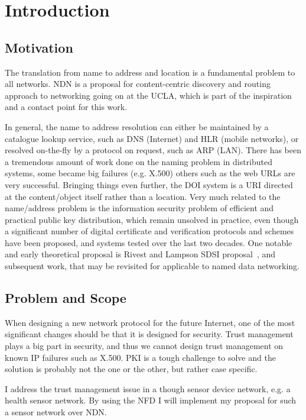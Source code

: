 \chapter{Introduction}\label{chp:introduction} 

\section{Motivation}
The translation from name to address and location is a fundamental problem to all networks.
\gls{NDN} is a proposal for content-centric discovery and routing approach to networking
going on at the \gls{UCLA}, which is part of the inspiration and a contact point for this work.

In general, the name to address resolution can either be maintained by a catalogue lookup service, 
such as \gls{DNS} (Internet) and \gls{HLR} (mobile networks), 
or resolved on-the-fly by a protocol on request, such as \gls{ARP} (\gls{LAN}). 
There has been a tremendous amount of work done on the naming problem in distributed systems, 
some became big failures (e.g. X.500) others such as the web \gls{URL}s are very successful. 
Bringing things even further, the \gls{DOI} system is a \gls{URI} directed at the content/object itself rather than a location. 
Very much related to the name/address problem is the information security problem of efficient and practical public key distribution, 
which remain unsolved in practice, even though a significant number of digital certificate and verification protocols and schemes have been proposed, and systems tested over the last two decades. 
One notable and early theoretical proposal is Rivest and Lampson \gls{SDSI} proposal~\cite{rivest1996sdsi},
and subsequent work, that may be revisited for applicable to named data networking.

\section{Problem and Scope}

When designing a new network protocol for the future Internet, one of the most significant changes should be that it is designed for security.
Trust management plays a big part in security, and thus we cannot design trust management on known \gls{IP} failures such as X.500. 
\gls{PKI} is a tough challenge to solve and the solution is probably not the one or the other, but rather case specific.

I address the trust management issue in a though sensor device network, e.g. a health sensor network.
By using the \gls{NFD} I will implement my proposal for such a sensor network over \gls{NDN}.


